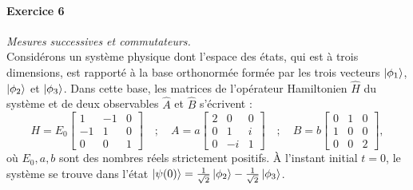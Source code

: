 \paragraph{Exercice 6} \textit{Mesures successives et commutateurs.}\\
Considérons un système physique dont l'espace des états, qui est à trois dimensions, est rapporté à la base orthonormée formée par les trois vecteurs $\ket{\phi_1}$, $\ket{\phi_2}$ et $\ket{\phi_3}$. Dans cette base, les matrices de l'opérateur Hamiltonien $\hat H$ du système et de deux observables $\hat A$ et $\hat B$ s'écrivent :
\begin{equation}
H = E_0 \left[
\begin{array}{ccc}
1 & -1 & 0 \\
-1 & 1 & 0 \\
0 & 0 & 1
\end{array}\right]
\quad ; \quad
A = a
\left[
\begin{array}{ccc}
2 & 0 & 0 \\
0 & 1 & i \\
0 & -i & 1
\end{array}\right] \quad ; \quad
B = b
\left[
\begin{array}{ccc}
0 & 1 & 0 \\
1 & 0 & 0 \\
0 & 0 & 2
\end{array}\right],
\end{equation}
où $E_0,a,b$ sont des nombres réels strictement positifs. À l'instant initial $t=0$, le système se trouve dans l'état $\ket{\psi(0)} = \frac{1}{\sqrt{2}}\ket{\phi_2}-\frac{1}{\sqrt{2}}\ket{\phi_3}$.

